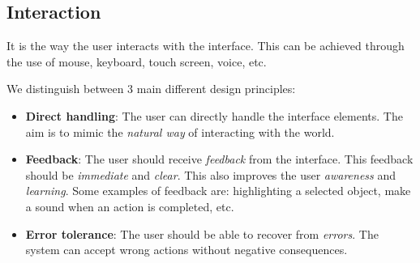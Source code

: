 \documentclass[11pt,a4paper]{article}
\theoremstyle{definition}
\theoremstyle{plain}
\theoremstyle{remark}
\begin{document}
\subsection{Interaction}
It is the way the user interacts with the interface. This can be achieved through the use of mouse, keyboard, touch screen, voice, etc.
\begin{tcolorbox}[colback=orange!5!white,colframe=orange!75!black,title=\textbf{Core Interaction Design Principles}]
We distinguish between 3 main different design principles:
\begin{itemize}
    \item \textbf{Direct handling}: The user can directly handle the interface elements. The aim is to mimic the \textit{natural way} of interacting with the world.
    \item \textbf{Feedback}: The user should receive \textit{feedback} from the interface. This feedback should be \textit{immediate} and \textit{clear}. This also improves 
    the user \textit{awareness} and \textit{learning}. Some examples of feedback are: highlighting a selected object, make a sound when an action is completed, etc.
    \item \textbf{Error tolerance}: The user should be able to recover from \textit{errors}. The system can accept wrong actions without negative consequences.
\end{itemize}
\end{tcolorbox}
\end{document}
